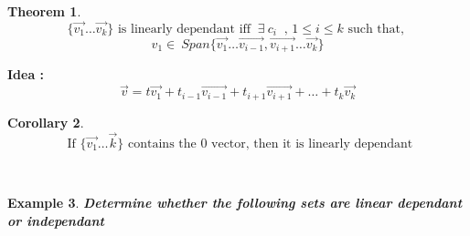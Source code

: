 \documentclass{article}
\newcounter{lecnum}
\newtheorem{theorem}{Theorem}[lecnum]
\newtheorem{ex}[theorem]{Example}
\newtheorem{corollary}[theorem]{Corollary}
\begin{document}
\begin{theorem}
\[ \{\vec{v_1} \ldots \vec{v_k} \} \text{ is linearly dependant iff }  \ \exists \ c_i \ \text{ , } 1 \leq i \leq  k  \text{ such that, } \]
\[ v_1 \in \ Span \{ \vec{v_1} \ldots \vec{v_{i-1} }, \vec{v_{i+1}} \ldots \vec{v_k} \} \]
\end{theorem}

\textbf{Idea : }
\[ \vec{v} = t\vec{v_1} + t_{i-1} \vec{v_{i -1}} + t_{i+1} \vec{v_{i+1}} + \ldots + t_k \vec{v_k} \]

\begin{corollary}
\[ \text{ If } \{\vec{v_1} \ldots \vec{k} \} \text{ contains the 0 vector, then it is linearly dependant} \] 
\end{corollary}

\newpage
\

\begin{ex}
\textbf{Determine whether the following  sets are linear dependant or independant}


\end{ex}
\end{document}
